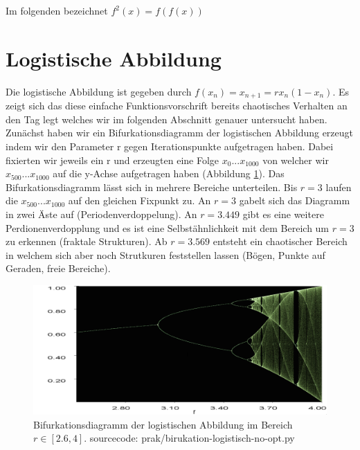 \documentclass{scrartcl}
\begin{document}
Im folgenden bezeichnet $f^2(x) = f(f(x))$

\tableofcontents

\section{Logistische Abbildung}
Die logistische Abbildung ist gegeben durch $f(x_n)=x_{n+1}=rx_n(1-x_n)$. Es zeigt sich das diese einfache Funktionsvorschrift 
bereits chaotisches Verhalten an den Tag legt welches wir im folgenden Abschnitt genauer untersucht haben. Zunächst haben 
wir ein Bifurkationsdiagramm der logistischen Abbildung erzeugt indem wir den Parameter r gegen Iterationspunkte aufgetragen haben. Dabei fixierten wir jeweils ein r und erzeugten eine Folge $x_0 ... x_{1000}$ von welcher wir $x_{500} ... x_{1000}$ auf die y-Achse aufgetragen haben (Abbildung \ref{fig:bifurkation-sin-nice}).
Das Bifurkationsdiagramm lässt sich in mehrere Bereiche unterteilen. Bis $r=3$ laufen die $x_{500}...x_{1000}$ auf den gleichen Fixpunkt zu. An $r=3$ gabelt sich das Diagramm in zwei Äste auf (Periodenverdoppelung). An $r=3.449$ gibt es eine weitere Perdionenverdopplung und es ist eine Selbstähnlichkeit mit dem Bereich um $r=3$ zu erkennen (fraktale Strukturen). Ab $r=3.569$ entsteht ein chaotischer Bereich in welchem sich aber noch Strutkuren feststellen lassen (Bögen, Punkte auf Geraden, freie Bereiche).
\begin{figure}[!htbp]
	\centering
	\includegraphics[scale=0.30]{bifurkation}
	\caption{Bifurkationsdiagramm der logistischen Abbildung im Bereich $r\in[2.6,4]$. sourcecode: prak/birukation-logistisch-no-opt.py}
	\label{fig:bifurkation-sin-nice}
\end{figure}
\end{document}
